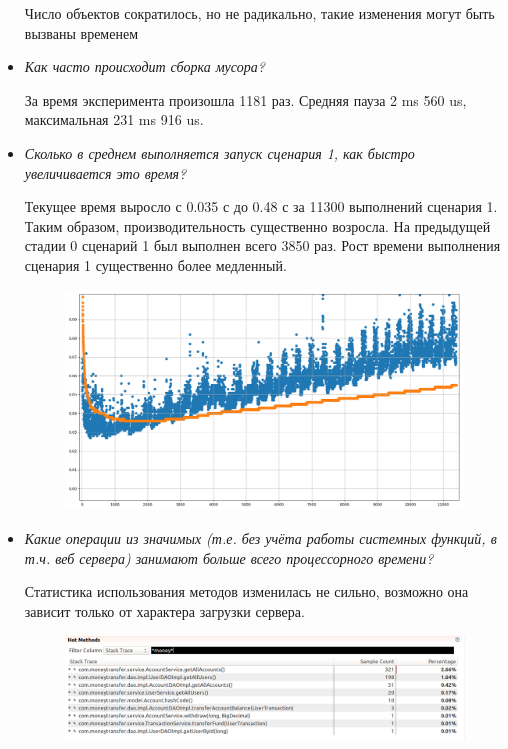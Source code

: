 \documentclass{article}
\begin{document}
\begin{itemize}
		Число объектов сократилось, но не радикально, такие изменения могут быть вызваны временем
				
		\item \textit{Как часто происходит сборка мусора?}
		
		За время эксперимента произошла 1181 раз. Средняя пауза 2 ms 560 us, максимальная 231 ms 916 us. 
		
		\item \textit{Сколько в среднем выполняется запуск сценария 1, как быстро увеличивается это время?}
		
		Текущее время выросло с 0.035 с до  0.48 с за 11300 выполнений сценария 1. 
		Таким образом, производительность существенно возросла. На предыдущей стадии 0 сценарий 1 был выполнен всего 3850 раз. 
		Рост времени выполнения сценария 1 существенно более медленный.
		
		\begin{figure}[h!] %
			\centering
			\includegraphics[width=0.95\linewidth]{img/stage_1/pyplot.png}
			\label{fig:pyplot1}
		\end{figure}
		
		\newpage
		\item \textit{Какие операции из значимых (т.е. без учёта работы системных функций, в т.ч. веб сервера) занимают больше всего процессорного времени?}
		
		Статистика использования методов изменилась не сильно, возможно она зависит только от характера загрузки сервера.
		
		\begin{figure}[h!] %
			\centering
			\includegraphics[width=0.95\linewidth]{img/stage_1/hotmethods.png}
			\label{fig:hotmethods1}
		\end{figure}
		

\end{itemize}
\end{document}
